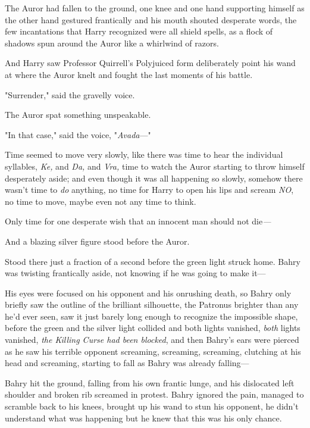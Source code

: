 The Auror had fallen to the ground, one knee and one hand supporting himself as
the other hand gestured frantically and his mouth shouted desperate words, the
few incantations that Harry recognized were all shield spells, as a flock of
shadows spun around the Auror like a whirlwind of razors.

And Harry saw Professor Quirrell's Polyjuiced form deliberately point his wand
at where the Auror knelt and fought the last moments of his battle.

"Surrender," said the gravelly voice.

The Auror spat something unspeakable.

"In that case," said the voice, "\emph{Avada}---"

Time seemed to move very slowly, like there was time to hear the individual
syllables, \emph{Ke,} and \emph{Da,} and \emph{Vra,} time to watch the Auror
starting to throw himself desperately aside; and even though it was all
happening so slowly, somehow there wasn't time to \emph{do} anything, no time
for Harry to open his lips and scream \emph{NO}, no time to move, maybe even
not any time to think.

Only time for one desperate wish that an innocent man should not die\emph{---}

And a blazing silver figure stood before the Auror.

Stood there just a fraction of a second before the green light struck home.
\later
Bahry was twisting frantically aside, not knowing if he was going to make it---

His eyes were focused on his opponent and his onrushing death, so Bahry only
briefly saw the outline of the brilliant silhouette, the Patronus brighter than
any he'd ever seen, saw it just barely long enough to recognize the impossible
shape, before the green and the silver light collided and both lights vanished,
\emph{both} lights vanished, \emph{the Killing Curse had been blocked}, and
then Bahry's ears were pierced as he saw his terrible opponent screaming,
screaming, screaming, clutching at his head and screaming, starting to fall as
Bahry was already falling---

Bahry hit the ground, falling from his own frantic lunge, and his dislocated
left shoulder and broken rib screamed in protest. Bahry ignored the pain,
managed to scramble back to his knees, brought up his wand to stun his
opponent, he didn't understand what was happening but he knew that this was his
only chance.

